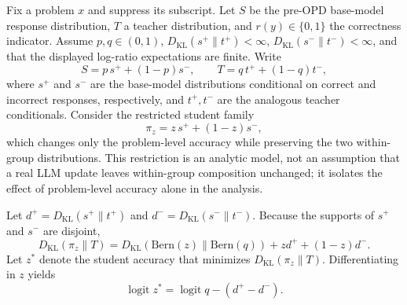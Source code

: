\documentclass{article}
\theoremstyle{opdplain}
\begin{document}
Fix a problem $x$ and suppress its subscript.
Let $S$ be the pre-OPD base-model response distribution, $T$ a teacher distribution, and $r(y)\in\{0,1\}$ the correctness indicator. Assume $p,q\in(0,1)$, $D_{\mathrm{KL}}(s^+\|t^+)<\infty$, $D_{\mathrm{KL}}(s^-\|t^-)<\infty$, and that the displayed log-ratio expectations are finite.
Write
\[
    S=p\,s^+ +(1-p)s^-,\qquad
    T=q\,t^+ +(1-q)t^-,
\]
where $s^+$ and $s^-$ are the base-model distributions conditional on correct and incorrect responses, respectively, and $t^+,t^-$ are the analogous teacher conditionals.
Consider the restricted student family
\[
    \pi_z=z\,s^+ +(1-z)s^- ,
\]
which changes only the problem-level accuracy while preserving the two within-group distributions.
This restriction is an analytic model, not an assumption that a real LLM update leaves within-group composition unchanged; it isolates the effect of problem-level accuracy alone in the analysis.

Let $d^+=D_{\mathrm{KL}}(s^+\|t^+)$ and $d^-=D_{\mathrm{KL}}(s^-\|t^-)$. Because the supports of $s^+$ and $s^-$ are disjoint,
\begin{equation}
    D_{\mathrm{KL}}(\pi_z\|T)
    =D_{\mathrm{KL}}(\mathrm{Bern}(z)\|\mathrm{Bern}(q))
     +z d^+ +(1-z)d^-.
    \label{eq:restricted-kl-decomposition}
\end{equation}
Let $z^*$ denote the student accuracy that minimizes $D_{\mathrm{KL}}(\pi_z\|T)$. Differentiating in $z$ yields
\[
    \operatorname{logit}z^*
    =\operatorname{logit}q-(d^+-d^-).
\]
\end{document}
